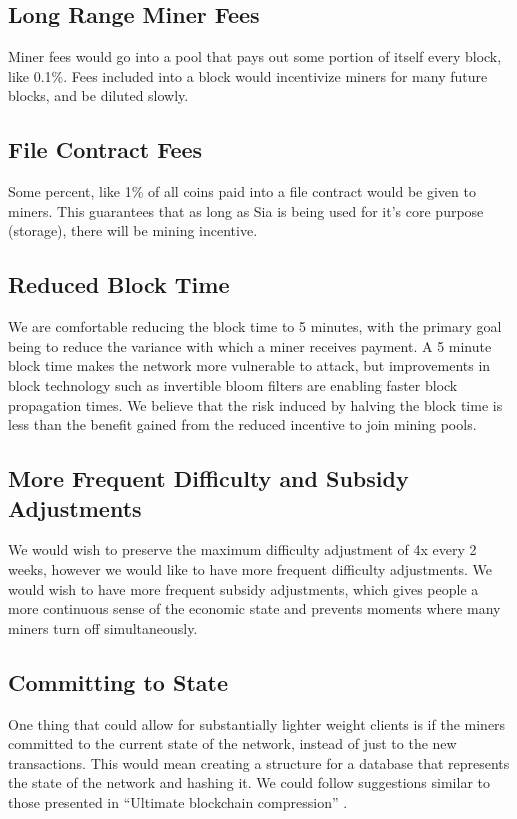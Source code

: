\documentclass[twocolumn]{article}
\begin{document}
\subsection{Long Range Miner Fees}
Miner fees would go into a pool that pays out some portion of itself every block, like 0.1\%.
Fees included into a block would incentivize miners for many future blocks, and be diluted slowly.

\subsection{File Contract Fees}
Some percent, like 1\% of all coins paid into a file contract would be given to miners.
This guarantees that as long as Sia is being used for it's core purpose (storage), there will be mining incentive.

\subsection{Reduced Block Time}
We are comfortable reducing the block time to 5 minutes, with the primary goal being to reduce the variance with which a miner receives payment.
A 5 minute block time makes the network more vulnerable to attack, but improvements in block technology such as invertible bloom filters \cite{ibf} are enabling faster block propagation times.
We believe that the risk induced by halving the block time is less than the benefit gained from the reduced incentive to join mining pools.

\subsection{More Frequent Difficulty and Subsidy Adjustments}
We would wish to preserve the maximum difficulty adjustment of 4x every 2 weeks, however we would like to have more frequent difficulty adjustments.
We would wish to have more frequent subsidy adjustments, which gives people a more continuous sense of the economic state and prevents moments where many miners turn off simultaneously.


\subsection{Committing to State}
One thing that could allow for substantially lighter weight clients is if the miners committed to the current state of the network, instead of just to the new transactions.
This would mean creating a structure for a database that represents the state of the network and hashing it.
We could follow suggestions similar to those presented in ``Ultimate blockchain compression'' \cite{ubc}.
\end{document}
